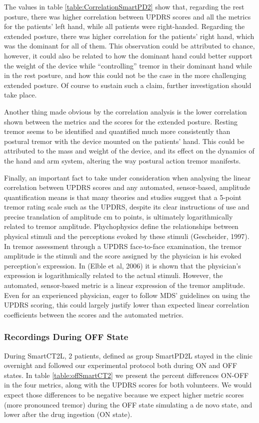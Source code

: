 The values in table \ref{table:CorrelationSmartPD2} show that, regarding the rest posture, there was higher correlation between \gls{UPDRS} scores and all the metrics for the patients' left hand, while all patients were right-handed. Regarding the extended posture, there was higher correlation for the patients' right hand, which was the dominant for all of them. This observation could be attributed to chance, however, it could also be related to how the dominant hand could better support the weight of the device while ``controlling'' tremor in their dominant hand while in the rest posture, and how this could not be the case in the more challenging extended posture. Of course to sustain such a claim, further investigation should take place. 

Another thing made obvious by the correlation analysis is the lower correlation shown between the metrics and the scores for the extended posture. Resting tremor seems to be identified and quantified much more consistently than postural tremor with the device mounted on the patients' hand. This could be attributed to the mass and weight of the device, and its effect on the dynamics of the hand and arm system, altering the way postural action tremor manifests. 

Finally, an important fact to take under consideration when analysing the linear correlation between \gls{UPDRS} scores and any automated, sensor-based, amplitude quantification means is that many theories and studies suggest that a 5-point tremor rating scale such as the \gls{UPDRS}, despite its clear instructions of use and precise translation of amplitude cm to points, is ultimately logarithmically related to tremor amplitude. Phychophysics define the relationships between physical stimuli and the perceptions evoked by these stimuli (Gescheider, 1997). In tremor assessment through a \gls{UPDRS} face-to-face examination, the tremor amplitude is the stimuli and the score assigned by the physician is his evoked perception's expression. In (Elble et al, 2006) it is shown that the physician's expression is logarithmically related to the actual stimuli. However, the automated, sensor-based metric is a linear expression of the tremor amplitude. Even for an experienced physician, eager to follow \gls{MDS}' guidelines on using the \gls{UPDRS} scoring, this could largely justify lower than expected linear correlation coefficients between the scores and the automated metrics. 

\subsubsection{Recordings During OFF State}
\label{subsubsec:SmartCT2OFF}
During \gls{SmartCT2L}, 2 patients, defined as group \gls{SmartPD2L} stayed in the clinic overnight and followed our experimental protocol both during ON and OFF states. In table \ref{table:offSmartCT2} we present the percent differences ON-OFF in the four metrics, along with the \gls{UPDRS} scores for both volunteers. We would expect those differences to be negative because we expect higher metric scores (more pronounced tremor) during the OFF state simulating a de novo state, and lower after the drug ingestion (ON state). 

